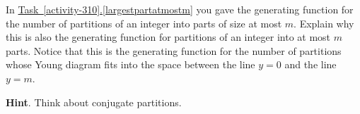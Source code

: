 \documentclass{book}
\begin{document}
\setcounter{cpjt}{318}
\addtocounter{cpjt}{-1}
\begin{activity}\label{atmostmparts}
\hypertarget{p-1574}{}%
In \hyperref[largestpartatmostm]{Task~\ref{activity-310}.\ref{largestpartatmostm}} you gave the generating function for the number of partitions of an integer into parts of size at most \(m\). Explain why this is also the generating function for partitions of an integer into at most \(m\) parts. Notice that this is the generating function for the number of partitions whose Young diagram fits into the space between the line \(y=0\) and the line \(y=m\).%
\par\smallskip%
\noindent\textbf{Hint}.\hypertarget{hint-207}{}\quad%
\hypertarget{p-1575}{}%
Think about conjugate partitions.%
\par\smallskip%
\noindent\end{activity}

\clearpage
\end{document}
